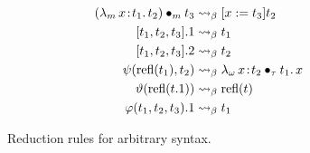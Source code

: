 
\begin{figure}
    \centering
    \begin{align*}
        ({\lambda_m}\, x\! : \! t_1.\, t_2) \bullet_{m} t_3 &\rightsquigarrow_\beta [ x := t_3]t_2 \\
        [t_1, t_2, t_3].1 &\rightsquigarrow_\beta t_1 \\
        [t_1, t_2, t_3].2 &\rightsquigarrow_\beta t_2 \\
        \psi(\text{refl}(t_1), t_2) &\rightsquigarrow_\beta {\lambda_\omega}\, x\! : \! t_2 \bullet_{\tau} t_1.\, x \\
        \vartheta(\text{refl}(t.1)) &\rightsquigarrow_\beta \text{refl}(t) \\
        \varphi(t_1, t_2, t_3).1 &\rightsquigarrow_\beta t_1
    \end{align*}
    \caption{Reduction rules for arbitrary syntax.}
\end{figure}


